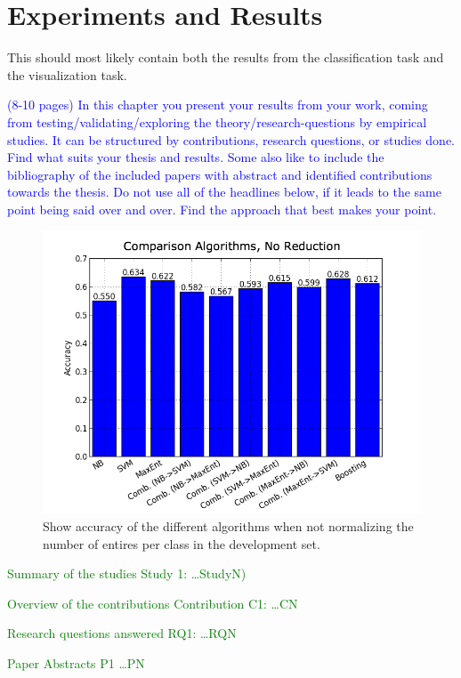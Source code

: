 \chapter{Experiments and Results}

This should most likely contain both the results from the classification task and the visualization task.

\textcolor{blue}{(8-10 pages) In this chapter you present your results from your work, coming from 
testing/validating/exploring the theory/research-questions by empirical studies. It can be structured by contributions, 
research questions, or studies done. Find what suits your thesis and results. Some also like to include the 
bibliography of the included papers with abstract and identified contributions towards the thesis. Do not use all of 
the headlines below, if it leads to the same point being said over and over. Find the approach that best makes your 
point.}

\begin{figure}[htb]
 \begin{center}
     \includegraphics[width=1.\textwidth]{../img/plots/comparison_no_reduce.png}
 \end{center}
 \caption[Comparison of different algorithms with a dateset without reduction]{Show accuracy of the different algorithms when not normalizing the number of entires per class in the development set.}
 \label{plot:comparison_no_reduce}
\end{figure}





\textcolor{green}{Summary of the studies Study 1: \ldots StudyN)}

\textcolor{green}{Overview of the contributions Contribution C1: \ldots CN}

\textcolor{green}{Research questions answered RQ1: \ldots RQN}

\textcolor{green}{Paper Abstracts P1 \ldots PN}